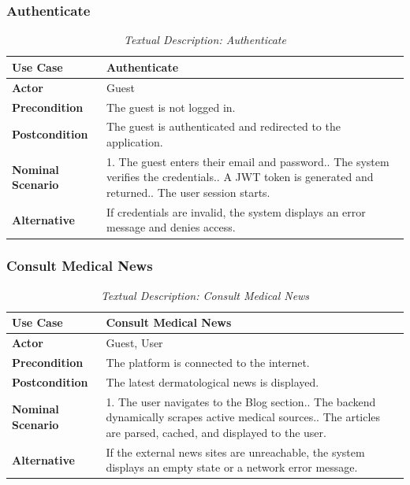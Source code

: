 \subsubsection{Authenticate}
\begin{table}[H]
\centering
\footnotesize
\renewcommand{\arraystretch}{1.5}
\begin{tabular}{|p{3cm}|p{11.5cm}|}
\hline
\rowcolor[HTML]{1F3864}
{\color{white}\textbf{Use Case}} & {\color{white}\textbf{Authenticate}} \\
\hline
\textbf{Actor} & Guest \\
\hline
\textbf{Precondition} & The guest is not logged in. \\
\hline
\textbf{Postcondition} & The guest is authenticated and redirected to the application. \\
\hline
\textbf{Nominal Scenario} & 
1. The guest enters their email and password.\newline
2. The system verifies the credentials.\newline
3. A JWT token is generated and returned.\newline
4. The user session starts. \\
\hline
\textbf{Alternative} & 
If credentials are invalid, the system displays an error message and denies access. \\
\hline
\end{tabular}
\caption{\textit{Textual Description: Authenticate}}
\end{table}

\subsubsection{Consult Medical News}
\begin{table}[H]
\centering
\footnotesize
\renewcommand{\arraystretch}{1.5}
\begin{tabular}{|p{3cm}|p{11.5cm}|}
\hline
\rowcolor[HTML]{1F3864}
{\color{white}\textbf{Use Case}} & {\color{white}\textbf{Consult Medical News}} \\
\hline
\textbf{Actor} & Guest, User \\
\hline
\textbf{Precondition} & The platform is connected to the internet. \\
\hline
\textbf{Postcondition} & The latest dermatological news is displayed. \\
\hline
\textbf{Nominal Scenario} & 
1. The user navigates to the Blog section.\newline
2. The backend dynamically scrapes active medical sources.\newline
3. The articles are parsed, cached, and displayed to the user. \\
\hline
\textbf{Alternative} & 
If the external news sites are unreachable, the system displays an empty state or a network error message. \\
\hline
\end{tabular}
\caption{\textit{Textual Description: Consult Medical News}}
\end{table}

